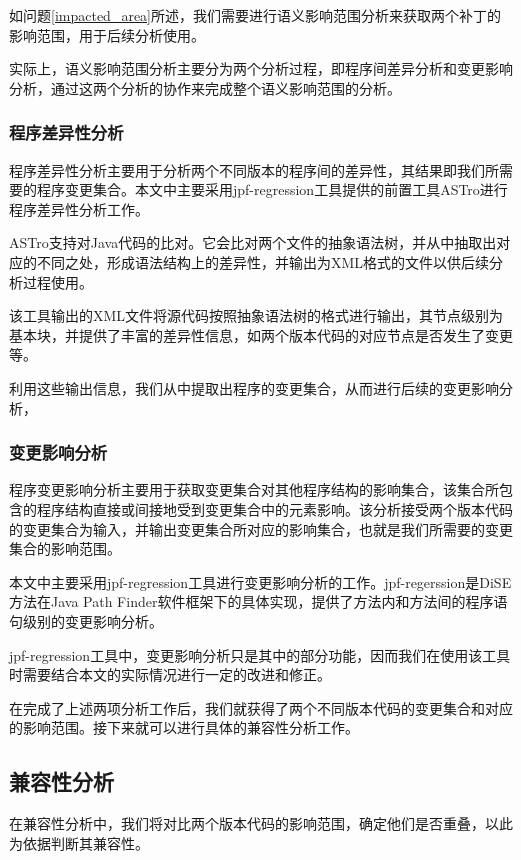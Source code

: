 如问题\ref {impacted_area}所述，我们需要进行语义影响范围分析来获取两个补丁的影响范围，用于后续分析使用。

实际上，语义影响范围分析主要分为两个分析过程，即程序间差异分析和变更影响分析，通过这两个分析的协作来完成整个语义影响范围的分析。

\subsubsection{程序差异性分析}

程序差异性分析主要用于分析两个不同版本的程序间的差异性，其结果即我们所需要的程序变更集合。本文中主要采用jpf-regression工具提供的前置工具ASTro进行程序差异性分析工作。

ASTro支持对Java代码的比对。它会比对两个文件的抽象语法树，并从中抽取出对应的不同之处，形成语法结构上的差异性，并输出为XML格式的文件以供后续分析过程使用。

该工具输出的XML文件将源代码按照抽象语法树的格式进行输出，其节点级别为基本块，并提供了丰富的差异性信息，如两个版本代码的对应节点是否发生了变更等。

利用这些输出信息，我们从中提取出程序的变更集合，从而进行后续的变更影响分析，

\subsubsection{变更影响分析}

程序变更影响分析主要用于获取变更集合对其他程序结构的影响集合，该集合所包含的程序结构直接或间接地受到变更集合中的元素影响。该分析接受两个版本代码的变更集合为输入，并输出变更集合所对应的影响集合，也就是我们所需要的变更集合的影响范围。

本文中主要采用jpf-regression工具进行变更影响分析的工作。jpf-regerssion是DiSE方法在Java Path Finder软件框架下的具体实现，提供了方法内和方法间的程序语句级别的变更影响分析。

jpf-regression工具中，变更影响分析只是其中的部分功能，因而我们在使用该工具时需要结合本文的实际情况进行一定的改进和修正。

在完成了上述两项分析工作后，我们就获得了两个不同版本代码的变更集合和对应的影响范围。接下来就可以进行具体的兼容性分析工作。

\subsection{兼容性分析}

在兼容性分析中，我们将对比两个版本代码的影响范围，确定他们是否重叠，以此为依据判断其兼容性。

